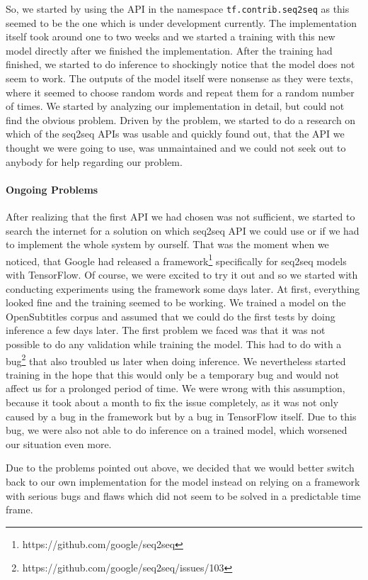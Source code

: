 So, we started by using the API in the namespace \texttt{tf.contrib.seq2seq} as this seemed to be the one which is under development currently. The implementation itself took around one to two weeks and we started a training with this new model directly after we finished the implementation. After the training had finished, we started to do inference to shockingly notice that the model does not seem to work. The outputs of the model itself were nonsense as they were texts, where it seemed to choose random words and repeat them for a random number of times. We started by analyzing our implementation in detail, but could not find the obvious problem. Driven by the problem, we started to do a research on which of the seq2seq APIs was usable and quickly found out, that the API we thought we were going to use, was unmaintained and we could not seek out to anybody for help regarding our problem.

\paragraph{Ongoing Problems} After realizing that the first API we had chosen was not sufficient, we started to search the internet for a solution on which seq2seq API we could use or if we had to implement the whole system by ourself. That was the moment when we noticed, that Google had released a framework\footnote{https://github.com/google/seq2seq} specifically for seq2seq models with TensorFlow. Of course, we were excited to try it out and so we started with conducting experiments using the framework some days later. At first, everything looked fine and the training seemed to be working. We trained a model on the OpenSubtitles corpus and assumed that we could do the first tests by doing inference a few days later. The first problem we faced was that it was not possible to do any validation while training the model. This had to do with a bug\footnote{https://github.com/google/seq2seq/issues/103} that also troubled us later when doing inference. We nevertheless started training in the hope that this would only be a temporary bug and would not affect us for a prolonged period of time. We were wrong with this assumption, because it took about a month to fix the issue completely, as it was not only caused by a bug in the framework but by a bug in TensorFlow itself. Due to this bug, we were also not able to do inference on a trained model, which worsened our situation even more.

Due to the problems pointed out above, we decided that we would better switch back to our own implementation for the model instead on relying on a framework with serious bugs and flaws which did not seem to be solved in a predictable time frame.


